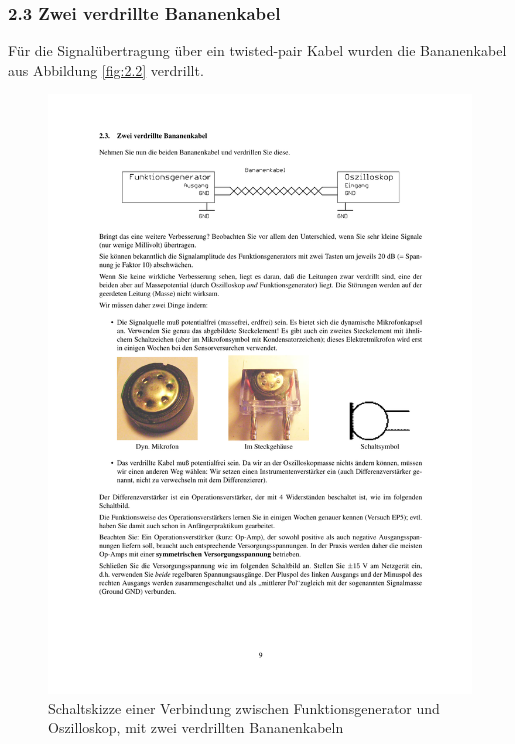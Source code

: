 \documentclass[12pt,a4paper]{article}
\begin{document}
\subsubsection{2.3 Zwei verdrillte Bananenkabel}

Für die Signalübertragung über ein twisted-pair Kabel wurden die Bananenkabel aus Abbildung \ref{fig:2.2} verdrillt.

\begin{figure}[H] 
  \centering
    \includegraphics[trim = 10mm 230mm 10mm 32mm, clip, scale = 1]{2_3.pdf}
  	\caption[Schaltskizze einer Verbindung zwischen Funktionsgenerator und Oszilloskop, mit zwei verdrillten Bananenkabeln]{Schaltskizze einer Verbindung zwischen Funktionsgenerator und Oszilloskop, mit zwei verdrillten Bananenkabeln\footnotemark}
  \label{fig:2.3}
\end{figure}
\end{document}
